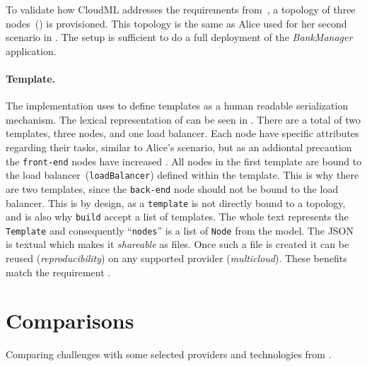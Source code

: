 
To validate how CloudML addresses the requirements from~,
a topology of three nodes~() is provisioned.
This topology is the same as Alice used for her second scenario in .
The setup is sufficient to do a full deployment of the \emph{BankManager} application.

\paragraph{Template.}


The implementation uses  to define templates as a human readable serialization mechanism.
The lexical representation of  can be seen in . 
There are a total of two templates, three nodes, and one load balancer.
Each node have specific attributes regarding their tasks, similar to Alice's scenario,
but as an addiontal precaution the \texttt{front-end} nodes have increased .
All nodes in the first template are bound to the load balancer~(\texttt{loadBalancer})
defined within the template.
This is why there are two templates, since the \texttt{back-end} node should not be bound to the load balancer.
This is by design, as a \texttt{template} is not directly bound to a topology,
and is also why \texttt{build} accept a list of templates.
The whole text represents the \texttt{Template} and consequently 
``\texttt{nodes}'' is a list of \texttt{Node} from the model.
The JSON is textual which makes it \emph{shareable} as files.
Once such a file is created it can be reused (\emph{reproducibility}) 
on any supported provider (\emph{multicloud}).
These benefits match the requirement .

\section{Comparisons}


Comparing challenges with some selected providers and technologies from .
